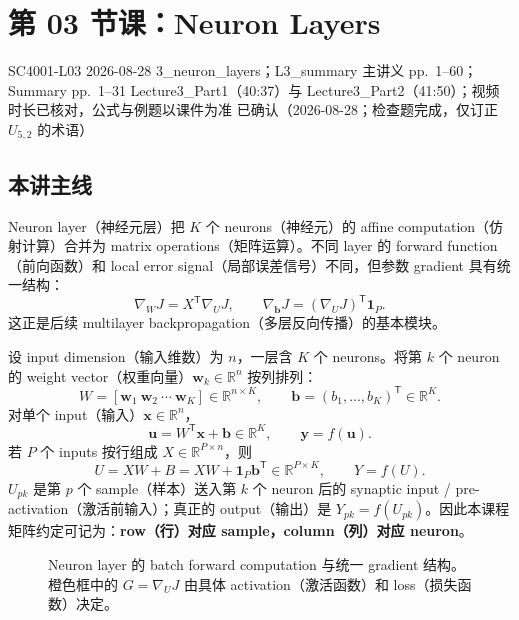 
\section{第 03 节课：Neuron Layers}
\label{lecture:SC4001-L03}

\lecturemeta
  {SC4001-L03}
  {2026-08-28}
  {3\_neuron\_layers；L3\_summary}
  {主讲义 pp.~1--60；Summary pp.~1--31}
  {Lecture3\_Part1（40:37）与 Lecture3\_Part2（41:50）；视频时长已核对，公式与例题以课件为准}
  {已确认（2026-08-28；检查题完成，仅订正 $U_{5,2}$ 的术语）}

\subsection{本讲主线}

Neuron layer（神经元层）把 $K$ 个 neurons（神经元）的 affine computation（仿射计算）合并为 matrix operations（矩阵运算）。不同 layer 的 forward function（前向函数）和 local error signal（局部误差信号）不同，但参数 gradient 具有统一结构：
\[
  \boxed{\nabla_WJ=X^{\mathsf T}\nabla_UJ},
  \qquad
  \boxed{\nabla_{\bm b}J=(\nabla_UJ)^{\mathsf T}\bm 1_P}.
\]
这正是后续 multilayer backpropagation（多层反向传播）的基本模块。


设 input dimension（输入维数）为 $n$，一层含 $K$ 个 neurons。将第 $k$ 个 neuron 的 weight vector（权重向量）$\bm w_k\in\mathbb R^n$ 按列排列：
\[
  W=[\bm w_1\ \bm w_2\ \cdots\ \bm w_K]\in\mathbb R^{n\times K},
  \qquad
  \bm b=(b_1,\ldots,b_K)^{\mathsf T}\in\mathbb R^K.
\]
对单个 input（输入）$\bm x\in\mathbb R^n$，
\[
  \boxed{\bm u=W^{\mathsf T}\bm x+\bm b}\in\mathbb R^K,
  \qquad
  \bm y=f(\bm u).
\]
若 $P$ 个 inputs 按行组成 $X\in\mathbb R^{P\times n}$，则
\[
  \boxed{U=XW+B=XW+\bm 1_P\bm b^{\mathsf T}}
  \in\mathbb R^{P\times K},
  \qquad Y=f(U).
\]
$U_{pk}$ 是第 $p$ 个 sample（样本）送入第 $k$ 个 neuron 后的 synaptic input / pre-activation（激活前输入）；真正的 output（输出）是 $Y_{pk}=f(U_{pk})$。因此本课程矩阵约定可记为：\textbf{row（行）对应 sample，column（列）对应 neuron}。

\begin{figure}[htbp]
  \centering
  \resizebox{0.98\textwidth}{!}{}
  \caption{Neuron layer 的 batch forward computation 与统一 gradient 结构。橙色框中的 $G=\nabla_UJ$ 由具体 activation（激活函数）和 loss（损失函数）决定。}
  \label{fig:sc4001-l03-layer-computation}
\end{figure}

